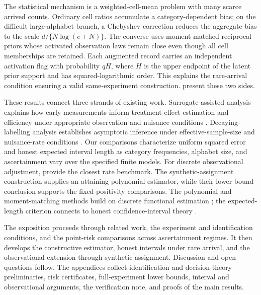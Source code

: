 \documentclass[11pt]{article}
\begin{document}
The statistical mechanism is a weighted-cell-mean problem with many scarce arrived counts. Ordinary cell ratios accumulate a category-dependent bias; on the difficult large-alphabet branch, a Chebyshev correction reduces the aggregate bias to the scale \(d/\{N\log(e+N)\}\). The converse uses moment-matched reciprocal priors whose activated observation laws remain close even though all cell memberships are retained. Each augmented record carries an independent activation flag with probability \(qH\), where \(H\) is the upper endpoint of the latent prior support and has squared-logarithmic order. This explains the rare-arrival condition ensuring a valid same-experiment construction.  present these two sides.

These results connect three strands of existing work. Surrogate-assisted analysis explains how early measurements inform treatment-effect estimation and efficiency under appropriate observation and nuisance conditions \citep[Theorems 2.1--2.2 and 4.1--4.2]{KallusMao2025}. Decaying-labelling analysis establishes asymptotic inference under effective-sample-size and nuisance-rate conditions \citep[Theorems 2.2 and 4.1, equation (2.3)]{ZhangChakraborttyBradic2025}. Our comparisons characterize uniform squared error and honest expected interval length as category frequencies, alphabet size, and ascertainment vary over the specified finite models. For discrete observational adjustment, \citet[Assumption 2, Theorems 1--2, Section 3.2, and Appendix C.5]{ZengBalakrishnanHanKennedy2026} provide the closest rate benchmark. The synthetic-assignment construction supplies an attaining polynomial estimator, while their lower-bound conclusion supports the fixed-positivity comparisons. The polynomial and moment-matching methods build on discrete functional estimation \citep{JiaoVenkatHanWeissman2015,Wu2016,WuYang2019}; the expected-length criterion connects to honest confidence-interval theory \citep{Donoho1994,Cai2004,ArmstrongKolesar2020}.



The exposition proceeds through related work, the experiment and identification conditions, and the point-risk comparisons across ascertainment regimes. It then develops the constructive estimator, honest intervals under rare arrival, and the observational extension through synthetic assignment. Discussion and open questions follow. The appendices collect identification and decision-theory preliminaries, risk certificates, full-experiment lower bounds, interval and observational arguments, the verification note, and proofs of the main results.
\end{document}

